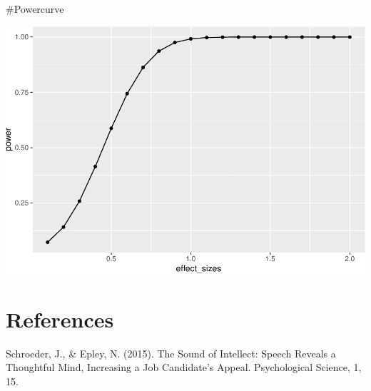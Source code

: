 \documentclass[
  english,
  man]{apa6}
\begin{document}
\#Powercurve

\includegraphics{CSF-semester-project_files/figure-latex/unnamed-chunk-7-1.pdf}

\newpage

\hypertarget{references}{%
\section{References}\label{references}}

Schroeder, J., \& Epley, N. (2015). The Sound of Intellect: Speech Reveals a Thoughtful Mind, Increasing a Job Candidate's Appeal. Psychological Science, 1, 15.

\begingroup
\setlength{\parindent}{-0.5in}
\setlength{\leftskip}{0.5in}
\end{document}
